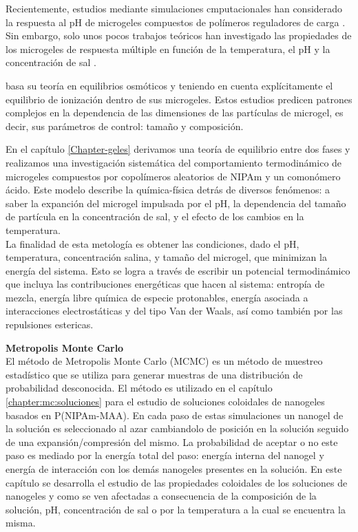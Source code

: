 Recientemente, estudios mediante simulaciones cmputacionales han considerado la respuesta al pH de microgeles compuestos de pol\'imeros reguladores de carga \cite{Schroeder2015,Rud2017,Sean2018, Hofzumahaus2018,Lu2019}.
Sin embargo, solo unos pocos trabajos te\'oricos han investigado las propiedades de los microgeles de respuesta m\'ultiple en funci\'on de la temperatura, el pH y la concentraci\'on de sal \cite{CaprilesGonzalez2008,polotsky2013collapse}.

\citet{polotsky2013collapse} basa su teor\'ia en equilibrios osm\'oticos y teniendo en cuenta expl\'icitamente el equilibrio de ionizaci\'on dentro de sus microgeles. Estos estudios predicen patrones complejos en la dependencia de las dimensiones de las part\'iculas de microgel, es decir, sus par\'ametros de control: tama\~no y composici\'on.

En el cap\'itulo \ref{Chapter-geles} derivamos una teor\'ia de equilibrio entre dos fases y realizamos una investigaci\'on sistem\'atica del comportamiento termodin\'amico de microgeles compuestos por copol\'imeros aleatorios de NIPAm y un comon\'omero \'acido. Este modelo describe la qu\'imica-f\'isica detr\'as de diversos fen\'omenos: a saber la expanci\'on del microgel impulsada por el pH, la dependencia del tama\~no de part\'icula en la concentraci\'on de sal, y el efecto de los cambios en la temperatura.\\ La finalidad de esta metolog\'ia es obtener las condiciones, dado el pH, temperatura, concentraci\'on salina, y tama\~no del microgel, que minimizan la energ\'ia  del sistema. Esto se logra a  trav\'es de escribir un potencial termodin\'amico que incluya las contribuciones energ\'eticas que hacen al sistema: entrop\'ia de mezcla, energ\'ia libre qu\'imica de especie protonables, energ\'ia asociada a interacciones electrost\'aticas y del tipo Van der Waals, as\'i  como tambi\'en por las repulsiones estericas.  




\textbf{Metropolis Monte Carlo}\\

El m\'etodo de Metropolis Monte Carlo (MCMC) es un m\'etodo de muestreo estad\'istico que se utiliza para generar muestras de una distribuci\'on de probabilidad desconocida. El m\'etodo es utilizado en el cap\'itulo \ref{chapter:mc:soluciones} para el estudio de soluciones coloidales de nanogeles basados en P(NIPAm-MAA). En cada paso de estas simulaciones un nanogel de la soluci\'on es seleccionado al azar cambiandolo de posici\'on en la soluci\'on seguido de una expansi\'on/compresi\'on del mismo.
La probabilidad de aceptar o no este paso es mediado por la energ\'ia total del paso: energ\'ia interna del nanogel y energ\'ia de interacci\'on con los dem\'as nanogeles presentes en la soluci\'on.
En este cap\'itulo se desarrolla el estudio de las propiedades coloidales de los soluciones de nanogeles y como se ven afectadas a consecuencia de la composici\'on de la soluci\'on, pH, concentraci\'on de sal o por la temperatura a la cual se encuentra la misma.


